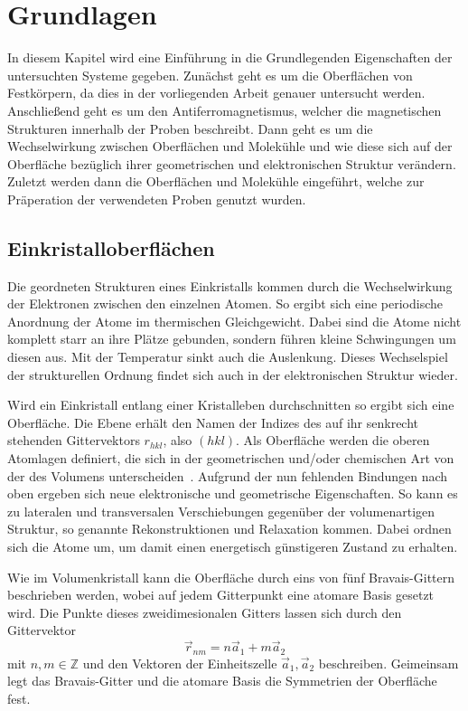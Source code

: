 \chapter{Grundlagen}
In diesem Kapitel wird eine Einführung in die Grundlegenden Eigenschaften der untersuchten Systeme gegeben.
Zunächst geht es um die Oberflächen von Festkörpern, da dies in der vorliegenden Arbeit genauer untersucht werden.
Anschließend geht es um den Antiferromagnetismus, welcher die magnetischen Strukturen innerhalb der Proben beschreibt.
Dann geht es um die Wechselwirkung zwischen Oberflächen und Molekühle und wie diese sich auf der Oberfläche bezüglich ihrer geometrischen und elektronischen Struktur verändern.
Zuletzt werden dann die Oberflächen und Molekühle eingeführt, welche zur Präperation der verwendeten Proben genutzt wurden.

    \section{Einkristalloberflächen}
        Die geordneten Strukturen eines Einkristalls kommen durch die Wechselwirkung der Elektronen zwischen den einzelnen Atomen.
        So ergibt sich eine periodische Anordnung der Atome im thermischen Gleichgewicht.
        Dabei sind die Atome nicht komplett starr an ihre Plätze gebunden, sondern führen kleine Schwingungen um diesen aus.
        Mit der Temperatur sinkt auch die Auslenkung.
        Dieses Wechselspiel der strukturellen Ordnung findet sich auch in der elektronischen Struktur wieder.
                
        Wird ein Einkristall entlang einer Kristalleben durchschnitten so ergibt sich eine Oberfläche.
        Die Ebene erhält den Namen der Indizes des auf ihr senkrecht stehenden Gittervektors $r_{hkl}$, also $(hkl)$.
        Als Oberfläche werden die oberen Atomlagen definiert, die sich in der geometrischen und/oder chemischen Art von der des Volumens unterscheiden~\cite{Fauster}.
        Aufgrund der nun fehlenden Bindungen nach oben ergeben sich neue elektronische und geometrische Eigenschaften.
        So kann es zu lateralen und transversalen Verschiebungen gegenüber der volumenartigen Struktur, so genannte Rekonstruktionen und Relaxation kommen.
        Dabei ordnen sich die Atome um, um damit einen energetisch günstigeren Zustand zu erhalten.
    
        Wie im Volumenkristall kann die Oberfläche durch eins von fünf Bravais-Gittern beschrieben werden, wobei auf jedem Gitterpunkt eine atomare Basis gesetzt wird.
        Die Punkte dieses zweidimesionalen Gitters lassen sich durch den Gittervektor
        \begin{equation}
            \vec{r}_{nm} = n \vec{a}_1 + m \vec{a}_2
            \label{eqn:Gittervek}
        \end{equation}
        mit $n,m \in \mathbb{Z}$ und den Vektoren der Einheitszelle $\vec{a}_1, \vec{a}_2$ beschreiben.
        Geimeinsam legt das Bravais-Gitter und die atomare Basis die Symmetrien der Oberfläche fest.
    
